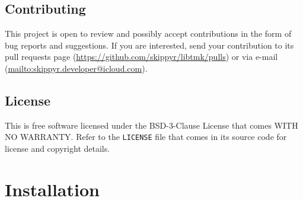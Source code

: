 \documentclass{report}
\begin{document}
\section{Contributing}
This project is open to review and possibly accept contributions in the form of bug reports and suggestions. If you are interested, send your contribution to its pull requests page (\url{https://github.com/skippyr/libtmk/pulls}) or via e-mail (\url{mailto:skippyr.developer@icloud.com}).
\section{License}
This is free software licensed under the BSD-3-Clause License that comes WITH NO WARRANTY. Refer to the \texttt{LICENSE} file that comes in its source code for license and copyright details.
\chapter{Installation}
\end{document}
